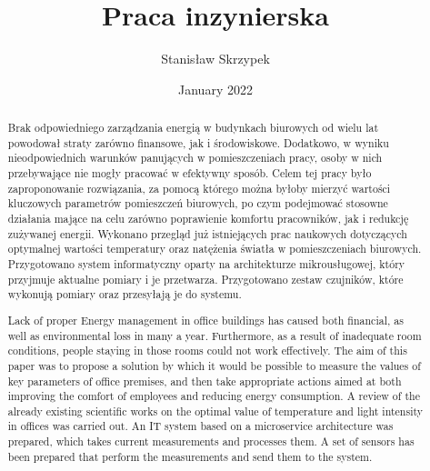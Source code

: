 \documentclass[11pt, a4]{article} %
\title{Praca inzynierska}
\author{Stanisław Skrzypek}
\date{January 2022}
\begin{document}
\maketitle

\begin{abstract}
    Brak odpowiedniego zarządzania energią w budynkach biurowych od wielu lat 
    powodował straty zarówno finansowe, jak i środowiskowe. Dodatkowo, w wyniku 
    nieodpowiednich warunków panujących w pomieszczeniach pracy, osoby w nich 
    przebywające nie mogły pracować w efektywny sposób. Celem tej pracy było 
    zaproponowanie rozwiązania, za pomocą którego można byłoby mierzyć wartości 
    kluczowych parametrów pomieszczeń biurowych, po czym podejmować stosowne 
    działania mające na celu zarówno poprawienie komfortu pracowników, jak i 
    redukcję zużywanej energii. Wykonano przegląd już istniejących prac naukowych 
    dotyczących optymalnej wartości temperatury oraz natężenia światła w 
    pomieszczeniach biurowych. Przygotowano system informatyczny oparty na 
    architekturze mikrousługowej, który przyjmuje aktualne pomiary i je przetwarza. 
    Przygotowano zestaw czujników, które wykonują pomiary oraz przesyłają 
    je do systemu. 
\end{abstract}

\begin{otherlanguage}{english}
\begin{abstract}
    Lack of proper Energy management in office buildings has caused both 
    financial, as well as environmental loss in many a year. Furthermore, as 
    a result of inadequate room conditions, people staying in those rooms could 
    not work effectively. The aim of this paper was to propose a solution by which 
    it would be possible to measure the values of key parameters of office 
    premises, and then take appropriate actions aimed at both improving the comfort 
    of employees and reducing energy consumption. A review of the already existing 
    scientific works on the optimal value of temperature and light intensity in 
    offices was carried out. An IT system based on a microservice architecture was 
    prepared, which takes current measurements and processes them. A set of sensors 
    has been prepared that perform the measurements and send them to the system.
\end{abstract}
\end{otherlanguage}
\end{document}
